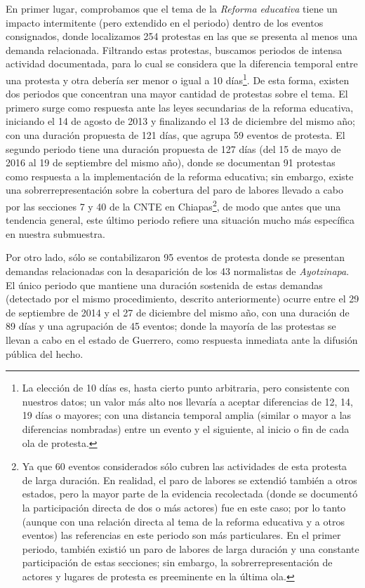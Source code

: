 \documentclass[letterpaper, 11pt]{book}
\theoremstyle{definition}
\theoremstyle{remark}
\begin{document}
En primer lugar, comprobamos que el tema de la \emph{Reforma educativa} tiene un impacto intermitente (pero extendido en el periodo) dentro de los eventos consignados, donde localizamos 254 protestas en las que se presenta al menos una demanda relacionada. 
Filtrando estas protestas, buscamos periodos de intensa actividad documentada, para lo cual se considera que la diferencia temporal entre una protesta y otra debería ser menor o igual a 10 días\footnote{
    La elección de 10 días es, hasta cierto punto arbitraria, pero consistente con nuestros datos; un valor más alto nos llevaría a aceptar diferencias de 12, 14, 19 días o mayores; con una distancia temporal amplia (similar o mayor a las diferencias nombradas) entre un evento y el siguiente, al inicio o fin de cada ola de protesta.
}. 
De esta forma, existen dos periodos que concentran una mayor cantidad de protestas sobre el tema. 
El primero surge como respuesta ante las leyes secundarias de la reforma educativa, iniciando el 14 de agosto de 2013 y finalizando el 13 de diciembre del mismo año; con una duración propuesta de 121 días, que agrupa 59 eventos de protesta. 
El segundo periodo tiene una duración propuesta de 127 días (del 15 de mayo de 2016 al 19 de septiembre del mismo año), donde se documentan 91 protestas como respuesta a la implementación de la reforma educativa; sin embargo, existe una sobrerrepresentación sobre la cobertura del paro de labores llevado a cabo por las secciones 7 y 40 de la CNTE en Chiapas\footnote{
    Ya que 60 eventos considerados sólo cubren las actividades de esta protesta de larga duración. 
    En realidad, el paro de labores se extendió también a otros estados, pero la mayor parte de la evidencia recolectada (donde se documentó la participación directa de dos o más actores) fue en este caso; por lo tanto (aunque con una relación directa al tema de la reforma educativa y a otros eventos) las referencias en este periodo son más particulares. 
    En el primer periodo, también existió un paro de labores de larga duración y una constante participación de estas secciones; sin embargo, la sobrerrepresentación de actores y lugares de protesta es preeminente en la última ola.
}, de modo que antes que una tendencia general, este último periodo refiere una situación mucho más específica en nuestra submuestra. 


Por otro lado, sólo se contabilizaron 95 eventos de protesta donde se presentan demandas relacionadas con la desaparición de los 43 normalistas de \emph{Ayotzinapa}. 
El único periodo que mantiene una duración sostenida de estas demandas (detectado por el mismo procedimiento, descrito anteriormente) ocurre entre el 29 de septiembre de 2014 y el 27 de diciembre del mismo año, con una duración de 89 días y una agrupación de 45 eventos; donde la mayoría de las protestas se llevan a cabo en el estado de Guerrero, como respuesta inmediata ante la difusión pública del hecho. 
\end{document}
